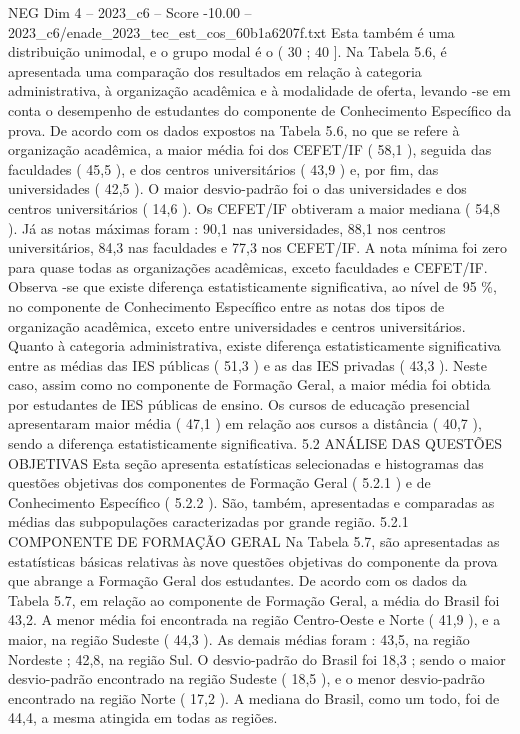 \begin{textsample}{NEG Dim 4 – 2023\_c6 – Score -10.00 – 2023\_c6/enade\_2023\_tec\_est\_cos\_60b1a6207f.txt}
Esta também é uma distribuição unimodal, e o grupo modal é o ( 30 ; 40 ].
Na Tabela 5.6, é apresentada uma comparação dos resultados em relação à categoria administrativa, à organização acadêmica e à modalidade de oferta, levando -se em conta o desempenho de estudantes do componente de Conhecimento Específico da prova.
De acordo com os dados expostos na Tabela 5.6, no que se refere à organização acadêmica, a maior média foi dos CEFET/IF ( 58,1 ), seguida das faculdades ( 45,5 ), e dos centros universitários ( 43,9 ) e, por fim, das universidades ( 42,5 ).
O maior desvio-padrão foi o das universidades e dos centros universitários ( 14,6 ).
Os CEFET/IF obtiveram a maior mediana ( 54,8 ).
Já as notas máximas foram : 90,1 nas universidades, 88,1 nos centros universitários, 84,3 nas faculdades e 77,3 nos CEFET/IF.
A nota mínima foi zero para quase todas as organizações acadêmicas, exceto faculdades e CEFET/IF.
Observa -se que existe diferença estatisticamente significativa, ao nível de 95 \%, no componente de Conhecimento Específico entre as notas dos tipos de organização acadêmica, exceto entre universidades e centros universitários.
Quanto à categoria administrativa, existe diferença estatisticamente significativa entre as médias das IES públicas ( 51,3 ) e as das IES privadas ( 43,3 ).
Neste caso, assim como no componente de Formação Geral, a maior média foi obtida por estudantes de IES públicas de ensino.
Os cursos de educação presencial apresentaram maior média ( 47,1 ) em relação aos cursos a distância ( 40,7 ), sendo a diferença estatisticamente significativa. 5.2 ANÁLISE DAS QUESTÕES OBJETIVAS Esta seção apresenta estatísticas selecionadas e histogramas das questões objetivas dos componentes de Formação Geral ( 5.2.1 ) e de Conhecimento Específico ( 5.2.2 ).
São, também, apresentadas e comparadas as médias das subpopulações caracterizadas por grande região. 5.2.1 COMPONENTE DE FORMAÇÃO GERAL Na Tabela 5.7, são apresentadas as estatísticas básicas relativas às nove questões objetivas do componente da prova que abrange a Formação Geral dos estudantes.
De acordo com os dados da Tabela 5.7, em relação ao componente de Formação Geral, a média do Brasil foi 43,2.
A menor média foi encontrada na região Centro-Oeste e Norte ( 41,9 ), e a maior, na região Sudeste ( 44,3 ).
As demais médias foram : 43,5, na região Nordeste ; 42,8, na região Sul.
O desvio-padrão do Brasil foi 18,3 ; sendo o maior desvio-padrão encontrado na região Sudeste ( 18,5 ), e o menor desvio-padrão encontrado na região Norte ( 17,2 ).
A mediana do Brasil, como um todo, foi de 44,4, a mesma atingida em todas as regiões.

\end{textsample}
